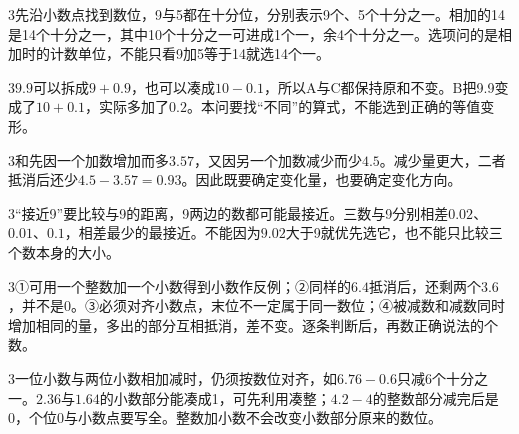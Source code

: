 \documentclass[multi=snippet,border={5bp 20bp 5bp 5bp}]{standalone}
\newenvironment{snippet}[3]{\begin{minipage}{#1bp}\color{answerred}\fontsize{#2}{#3}\selectfont\raggedright}{\end{minipage}}
\begin{document}
\begin{snippet}{505}{11.5}{14}\begin{multicols}{3}\raggedcolumns 先沿小数点找到数位，9与5都在十分位，分别表示9个、5个十分之一。相加的14是14个十分之一，其中10个十分之一可进成1个一，余4个十分之一。选项问的是相加时的计数单位，不能只看9加5等于14就选14个一。\end{multicols}\end{snippet}
\begin{snippet}{505}{11.5}{14}\begin{multicols}{3}\raggedcolumns \(9.9\)\allowbreak 可以拆成\(9+0.9\)\allowbreak ，也可以凑成\(10-0.1\)\allowbreak ，所以A与C都保持原和不变。B把9.9变成了\(10+0.1\)\allowbreak ，实际多加了\(0.2\)\allowbreak 。本问要找“不同”的算式，不能选到正确的等值变形。\end{multicols}\end{snippet}
\begin{snippet}{505}{11.5}{14}\begin{multicols}{3}\raggedcolumns 和先因一个加数增加而多\(3.57\)\allowbreak ，又因另一个加数减少而少\(4.5\)\allowbreak 。减少量更大，二者抵消后还少\(4.5-3.57=0.93\)\allowbreak 。因此既要确定变化量，也要确定变化方向。\end{multicols}\end{snippet}
\begin{snippet}{505}{11.5}{14}\begin{multicols}{3}\raggedcolumns “接近9”要比较与9的距离，9两边的数都可能最接近。三数与9分别相差\(0.02\)\allowbreak 、\(0.01\)\allowbreak 、\(0.1\)\allowbreak ，相差最少的最接近。不能因为\(9.02\)\allowbreak 大于9就优先选它，也不能只比较三个数本身的大小。\end{multicols}\end{snippet}
\begin{snippet}{505}{11.5}{14}\begin{multicols}{3}\raggedcolumns ①可用一个整数加一个小数得到小数作反例；②同样的\(6.4\)\allowbreak 抵消后，还剩两个\(3.6\)\allowbreak ，并不是0。③必须对齐小数点，末位不一定属于同一数位；④被减数和减数同时增加相同的量，多出的部分互相抵消，差不变。逐条判断后，再数正确说法的个数。\end{multicols}\end{snippet}
\begin{snippet}{505}{11.5}{14}\begin{multicols}{3}\raggedcolumns 一位小数与两位小数相加减时，仍须按数位对齐，如\(6.76-0.6\)\allowbreak 只减6个十分之一。\(2.36\)\allowbreak 与\(1.64\)\allowbreak 的小数部分能凑成1，可先利用凑整；\(4.2-4\)\allowbreak 的整数部分减完后是0，个位0与小数点要写全。整数加小数不会改变小数部分原来的数位。\end{multicols}\end{snippet}
\end{document}
